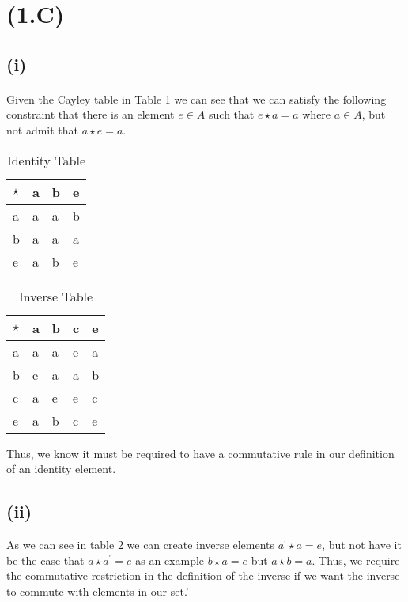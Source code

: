 \documentclass{article}
\begin{document}
    \section*{(1.C)}
            \subsection*{(i)}
                \paragraph{}
                Given the Cayley table in Table 1 we can see that we can satisfy the following constraint that there is an element $e \in A$ such that $e \star a = a$ where $a \in A$, but not admit that $a \star e = a$.
        
                \FloatBarrier
                \begin{table}[h]
                    \centering
                    \caption{Identity Table}
                    \begin{tabular}{|l|l|l|l|}
                    \hline
                    $\star$ & a & b & e \\ \hline
                    a     & a & a & b \\ \hline
                    b     & a & a & a \\ \hline
                    e     & a & b & e \\ \hline
                    \end{tabular}
                \end{table}
                \begin{table}[h]
                    \centering
                    \caption{Inverse Table}
                    \label{my-label}
                    \begin{tabular}{|l|l|l|l|l|}
                    \hline
                    $\star$ & a & b & c & e \\ \hline
                    a       & a & a & e & a \\ \hline
                    b       & e & a & a & b \\ \hline
                    c       & a & e & e & c \\ \hline
                    e       & a & b & c & e \\ \hline
                    \end{tabular}
                    \end{table}
                \FloatBarrier
        
                Thus, we know it must be required to have a commutative rule in our definition of an identity element.
        
            \subsection*{(ii)}
            As we can see in table 2 we can create inverse elements $a^{\prime} \star a = e$, but not have it be the case that $a \star a^{\prime} = e$ as an example $b \star a = e$ but $a \star b = a$. Thus, we require the commutative restriction in the definition of the inverse if we want the inverse to commute with elements in our set.'
     
    
  
\end{document}
